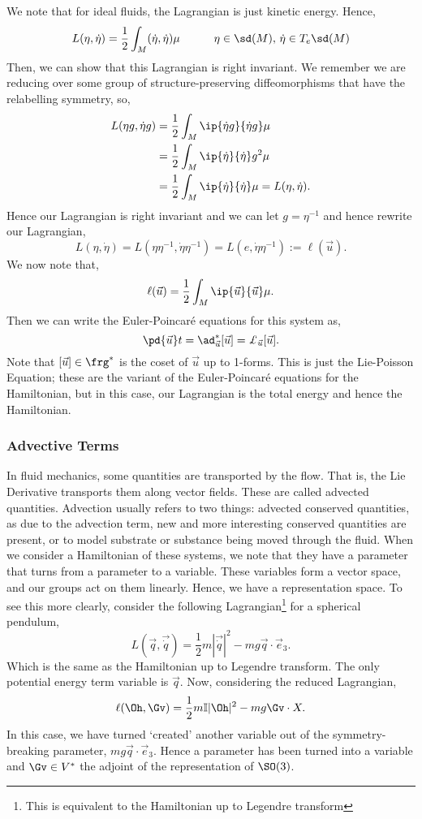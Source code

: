 \noindent
We note that for ideal fluids, the Lagrangian is just kinetic energy. Hence,
$$ L(\eta, \dot \eta) = \frac{1}{2}\int_M (\dot \eta, \dot \eta) \mu \qquad \quad \eta \in \sd (M),\, \dot \eta \in T_e\sd (M)$$
Then, we can show that this Lagrangian is right invariant. We remember we are reducing over some group of structure-preserving diffeomorphisms that have the relabelling symmetry, so,
\begin{align*}
  L(\eta g, \dot \eta g) &= \frac{1}{2}\int_M \ip{\dot \eta g}{\dot \eta g}\mu \\
  &= \frac{1}{2}\int_M \ip{\dot \eta}{\dot \eta} g^2\mu \\
  &= \frac{1}{2}\int_M \ip{\dot \eta}{\dot \eta}\mu  = L(\eta, \dot \eta).
\end{align*}
\noindent
Hence our Lagrangian is right invariant and we can let $g = \eta^{-1}$ and hence rewrite our Lagrangian,
$$ L(\eta, \dot \eta) = L(\eta\eta^{-1}, \dot \eta \eta^{-1}) = L(e, \dot \eta \eta^{-1}) := \ell({\vec u}). $$
We now note that,
$$ \ell({\vec u}) = \frac{1}{2}\int_M \ip{{\vec u}}{{\vec u}}\mu. $$
Then we can write the Euler-Poincar\'e equations for this system as,
$$ \pd {\vec u} t = \ad^*_{\vec u}{[\vec u]} = \pounds_{\vec u} [{\vec u}]. $$
Note that $[\vec u]\in \frg^*$ is the coset of $\vec u$ up to 1-forms. This is just the Lie-Poisson Equation; these are the variant of the Euler-Poincar\'e equations for the Hamiltonian, but in this case, our Lagrangian is the total energy and hence the Hamiltonian.\\

\subsubsection{Advective Terms}
In fluid mechanics, some quantities are transported by the flow. That is, the Lie Derivative transports them along vector fields. These are called advected quantities. Advection usually refers to two things: advected conserved quantities, as due to the advection term, new and more interesting conserved quantities are present, or to model substrate or substance being moved through the fluid. When we consider a Hamiltonian of these systems, we note that they have a parameter that turns from a parameter to a variable. These variables form a vector space, and our groups act on them linearly. Hence, we have a representation space. To see this more clearly, consider the following Lagrangian\footnote{This is equivalent to the Hamiltonian up to Legendre transform} for a spherical pendulum,
$$ L(\vec q, \vec{\dot q}) = \frac{1}{2}m |\vec{\dot q}|^2 - mg \vec q \cdot \vec e_3. $$
Which is the same as the Hamiltonian up to Legendre transform. The only potential energy term variable is $\vec q$. Now, considering the reduced Lagrangian,
$$ \ell(\Oh, \Gv) = \frac{1}{2}m \mathbb{I}|\Oh|^2 - mg\Gv \cdot X. $$
In this case, we have turned `created' another variable out of the symmetry-breaking parameter, $mg \vec q \cdot \vec e_3$. Hence a parameter has been turned into a variable and $\Gv \in V^*$ the adjoint of the representation of $\SO(3)$.\\

